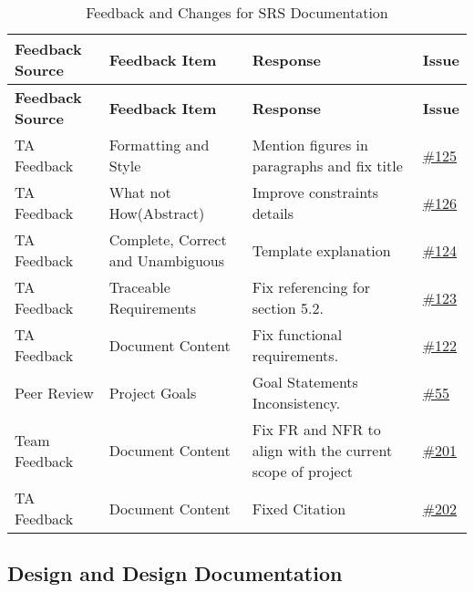\documentclass{article}
\begin{document}
\begin{longtable}{| p{} | p{} | p{} | p{} |}
    \caption{Feedback and Changes for SRS Documentation} \\
    \hline
    \textbf{Feedback Source} & \textbf{Feedback Item} & \textbf{Response} & \textbf{Issue} \\
    \hline
    \endfirsthead
    \hline
    \textbf{Feedback Source} & \textbf{Feedback Item} & \textbf{Response} & \textbf{Issue} \\
    \hline
    \endhead
    \hline
    \endfoot
    TA Feedback & Formatting and Style & Mention figures in paragraphs and fix title & \href{https://github.com/RezaJodeiri/CXR-Capstone/issues/125}{\#125}\\
    \hline
    TA Feedback & What not How(Abstract) & Improve constraints details & \href{https://github.com/RezaJodeiri/CXR-Capstone/issues/126}{\#126} \\
    \hline
    TA Feedback & Complete, Correct and Unambiguous & Template explanation & \href{https://github.com/RezaJodeiri/CXR-Capstone/issues/124}{\#124}\\
    \hline
    TA Feedback & Traceable Requirements & Fix referencing for section 5.2. & \href{https://github.com/RezaJodeiri/CXR-Capstone/issues/123}{\#123} \\
    \hline
    TA Feedback & Document Content & Fix functional requirements. & \href{https://github.com/RezaJodeiri/CXR-Capstone/issues/122}{\#122} \\
    \hline
    Peer Review & Project Goals & Goal Statements Inconsistency. & \href{https://github.com/RezaJodeiri/CXR-Capstone/issues/55}{\#55} \\
    \hline
    Team Feedback & Document Content & Fix FR and NFR to align with the current scope of project & \href{https://github.com/RezaJodeiri/CXR-Capstone/issues/201}{\#201}\\
    \hline
    TA Feedback & Document Content & Fixed Citation & \href{https://github.com/RezaJodeiri/CXR-Capstone/issues/202}{\#202}\\
    \hline
    \hline

\end{longtable}

\subsection{Design and Design Documentation}
\end{document}
